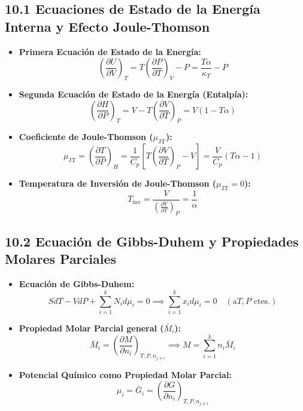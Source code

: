 \documentclass[11pt,a4paper]{article}
\begin{document}
\subsection*{10.1 Ecuaciones de Estado de la Energía Interna y Efecto Joule-Thomson}

\begin{itemize}
  \item \textbf{Primera Ecuación de Estado de la Energía:}
  \[
    \left( \frac{\partial U}{\partial V} \right)_T = T \left( \frac{\partial P}{\partial T} \right)_V - P = \frac{T \alpha}{\kappa_T} - P
  \]
  \item \textbf{Segunda Ecuación de Estado de la Energía (Entalpía):}
  \[
    \left( \frac{\partial H}{\partial P} \right)_T = V - T \left( \frac{\partial V}{\partial T} \right)_P = V(1 - T\alpha)
  \]
  \item \textbf{Coeficiente de Joule-Thomson ($\mu_{\mathrm{JT}}$):}
  \[
    \mu_{\mathrm{JT}} = \left( \frac{\partial T}{\partial P} \right)_H = \frac{1}{C_p} \left[ T \left( \frac{\partial V}{\partial T} \right)_P - V \right] = \frac{V}{C_p}(T\alpha - 1)
  \]
  \item \textbf{Temperatura de Inversión de Joule-Thomson ($\mu_{\mathrm{JT}} = 0$):}
  \[
    T_{\mathrm{inv}} = \frac{V}{\left( \frac{\partial V}{\partial T} \right)_P} = \frac{1}{\alpha}
  \]
\end{itemize}

\subsection*{10.2 Ecuación de Gibbs-Duhem y Propiedades Molares Parciales}

\begin{itemize}
  \item \textbf{Ecuación de Gibbs-Duhem:}
  \[
    S dT - V dP + \sum_{i=1}^k N_i d\mu_i = 0 \implies \sum_{i=1}^k x_i d\mu_i = 0 \quad (\mathrm{a } T, P \text{ ctes.})
  \]
  \item \textbf{Propiedad Molar Parcial general ($\bar{M}_i$):}
  \[
    \bar{M}_i = \left( \frac{\partial M}{\partial n_i} \right)_{T, P, n_{j \neq i}} \implies M = \sum_{i=1}^k n_i \bar{M}_i
  \]
  \item \textbf{Potencial Químico como Propiedad Molar Parcial:}
  \[
    \mu_i = \bar{G}_i = \left( \frac{\partial G}{\partial n_i} \right)_{T, P, n_{j \neq i}}
  \]
\end{itemize}
\end{document}
